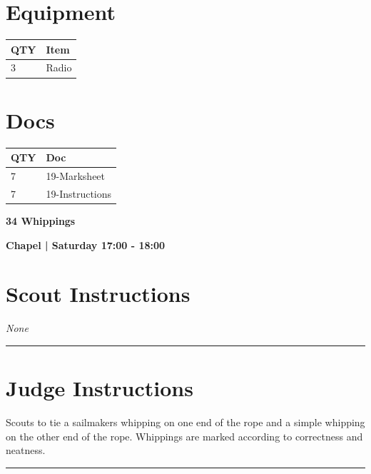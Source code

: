 \documentclass[10pt]{article}
\newcommand{\newtitle}[1]{\begin{center}{\Huge\bfseries #1 }\\ \vspace{5mm}\end{center}}
\newcommand{\newsubtitle}[1]{\begin{center}{\color{grey}\Large\bfseries #1 }\\ \vspace{5mm}\end{center}}
\begin{document}
	\begin{multicols}{2}

		\section*{\faWrench \: Equipment}

		
	\begin{center}
			\begin{tabular}{p{2cm}p{4cm}}


				\textbf{QTY} & \textbf{Item} \\\toprule
												3&Radio\\\midrule
								\end{tabular}

			\end{center}

		
		\vfill\null
		\columnbreak

			\section*{\faFile \: Docs}
		 	\begin{center}
			\begin{tabular}{p{2cm}p{4cm}}

			\textbf{QTY} & \textbf{Doc} \\\toprule
										7&19-Marksheet\\\midrule
										7&19-Instructions\\\midrule
							\end{tabular}
			\end{center}
	

		\vfill\null

		\end{multicols}



	\vspace{1cm}


	\clearpage
		\newtitle{34 Whippings }
	\newsubtitle{Chapel | Saturday 17:00 - 18:00}
		\setcounter{section}{33}
	\section*{Scout Instructions}
		\textit{None}
	
	\vspace{0.5cm}
	\hrule
	\vspace{0.5cm}

		\section*{Judge Instructions}
		Scouts to tie a sailmakers whipping on one end of the rope and a simple whipping on the other end of the rope. Whippings are marked according to correctness and neatness.
\vspace{0.5cm}
	\hrule
	\vspace{0.5cm}
\end{document}
